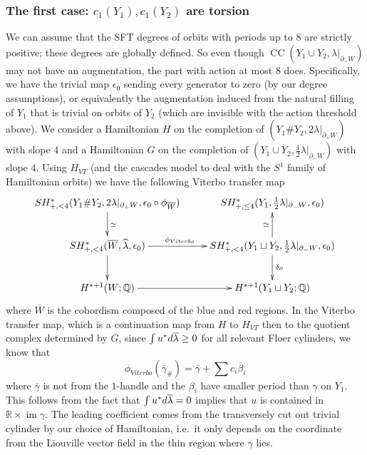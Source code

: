 \documentclass[reqno,11pt]{amsart}
\numberwithin{equation}{section}
\def\R{\mathbb{R}}
\def\Q{{\mathbb Q}}
\def\rd{{\rm d}}
\DeclareMathOperator{\Ima}{im}
\DeclareMathOperator{\CC}{CC}
\begin{document}
\subsubsection{The first case: $c_1(Y_1),c_1(Y_2)$ are torsion}\label{sss:421} We can assume that the SFT degrees of orbits with periods up to $8$ are strictly positive; these degrees are globally defined. So even though $\CC(Y_1\cup Y_2,\lambda|_{\partial_-W})$ may not have an augmentation, the part with action at most $8$ does. Specifically, we have the trivial map $\epsilon_0$ sending every generator to zero (by our degree assumptions), or equivalently the augmentation induced from the natural filling of $Y_1$ that is trivial on orbits of $Y_2$ (which are invisible with the action threshold above). We consider a Hamiltonian $H$ on the completion of $(Y_1\#Y_2, 2\lambda|_{\partial_+W})$ with slope $4$ and a Hamiltonian $G$ on the completion of $(Y_1\cup Y_2,\frac{1}{2}\lambda|_{\partial_-W})$ with slope $4$. Using $H_{VT}$ (and the cascades model to deal with the $S^1$ family of Hamiltonian orbits) we have the following Viterbo transfer map
\begin{equation}\label{eqn:diagram}
\xymatrix{
SH_{+,<4}^*(Y_1\#Y_2, 2\lambda|_{\partial_+W},\epsilon_0\circ \phi_{\overline{W}})\ar[d]^{\simeq}  & SH^*_{+,\le 4}(Y_1,\frac{1}{2}\lambda|_{\partial_-W},\epsilon_0)\\
SH_{+,<4}^*(\overline{W},\widehat{\lambda},\epsilon_0) \ar[r]^{\phi_{Viterbo}\qquad }\ar[d] & SH_{+,<4}^*(Y_1\sqcup Y_2, \frac{1}{2} \lambda|_{\partial_-W},  \epsilon_0)\ar[u]^{\simeq}\ar[d]^{\delta_{\partial}}\\
H^{*+1}(W;\Q) \ar[r] & H^{*+1}(Y_1\sqcup Y_2;\Q)
}
\end{equation}
where $\overline{W}$ is the cobordism composed of the blue and red regions. In the Viterbo transfer map, which is a continuation map from $H$ to $H_{VT}$ then to the quotient complex determined by $G$, since $\int u^*\rd \overline{\lambda} \ge 0$ for all relevant Floer cylinders, we know that 
\begin{equation}\label{eqn:vit}
    \phi_{Viterbo}(\overline{\gamma}_{\#})=\overline{\gamma}+\sum c_i\overline{\beta}_i
\end{equation}
where $\overline{\gamma}$ is not from the $1$-handle and the $\beta_i$ have smaller period than $\gamma$ on $Y_1$. This follows from the fact that $\int u^*\rd \overline{\lambda} =0$ implies that $u$ is contained in $\R\times \Ima \gamma$. The leading coefficient comes from the transversely cut out trivial cylinder by our choice of Hamiltonian, i.e.\ it only depends on the coordinate from the Liouville vector field in the thin region where $\gamma$ lies. 
\end{document}
